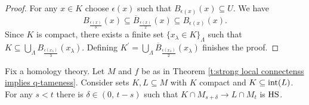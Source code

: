 \begin{proof}
	For any $x \in K$ choose $\epsilon(x)$ such that $B_{\epsilon(x)}(x) \subseteq U$. We have
	\begin{equation*}
	B_{\frac{\epsilon(x)}{3}}(x) \subseteq \overline B_{\frac{\epsilon(x)}{2}}(x) \subseteq B_{\epsilon(x)}(x).
	\end{equation*}
	Since $K$ is compact, there exists a finite set $\{x_\lambda \in K\}_{\Lambda}$ such that $K \subseteq \bigcup_{\Lambda} B_{\frac{\epsilon(x_\lambda)}{3}}(x_\lambda)$. Defining $K^\prime = \bigcup_{\Lambda} \overline B_{\frac{\epsilon(x_\lambda)}{2}}(x_\lambda)$ finishes the proof.
\end{proof}

\begin{lem} \label{l:key lemma for q-tameness}
	Fix a homology theory. Let $M$ and $f$ be as in Theorem \ref{t:strong local connectenss implies q-tameness}.
	Consider sets $K, L \subseteq M$ with $K$ compact and $K \subseteq \operatorname{int}(L)$. For any $s < t$ there is $\delta \in (0,\, t-s)$ such that $K \cap M_{s+\delta} \to L \cap M_{t}$ is $\mathrm{HS}$.
\end{lem}

